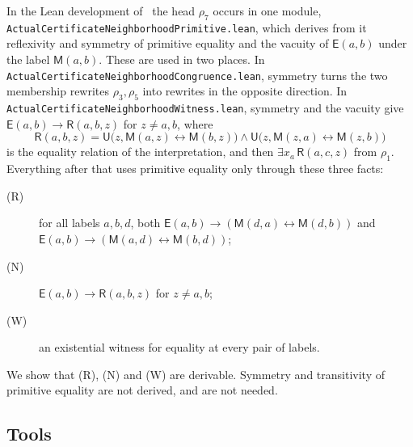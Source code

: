 \documentclass[11pt,letterpaper]{article}
\newcommand{\Mc}{\mathsf{M}}
\newcommand{\Uc}{\mathsf{U}}
\newcommand{\Ec}{\mathsf{E}}
\newcommand{\Rc}{\mathsf{R}}
\newcommand{\file}[1]{\texttt{\nolinkurl{#1}}}
\begin{document}
In the Lean development of~\cite{pa209} the head $\rho_7$ occurs in
one module, \file{ActualCertificateNeighborhoodPrimitive.lean}, which
derives from it reflexivity and symmetry of primitive equality and the
vacuity of $\Ec(a,b)$ under the label $\Mc(a,b)$. These are used in two
places. In \file{ActualCertificateNeighborhoodCongruence.lean},
symmetry turns the two membership rewrites $\rho_3,\rho_5$ into
rewrites in the opposite direction. In
\file{ActualCertificateNeighborhoodWitness.lean}, symmetry and the
vacuity give $\Ec(a,b)\to\Rc(a,b,z)$ for $z\ne a,b$, where
\[
 \Rc(a,b,z)=\Uc\bigl(z,\Mc(a,z)\leftrightarrow\Mc(b,z)\bigr)\wedge
            \Uc\bigl(z,\Mc(z,a)\leftrightarrow\Mc(z,b)\bigr)
\]
is the equality relation of the interpretation, and then
$\exists x_a\,\Rc(a,c,z)$ from $\rho_1$. Everything after that uses
primitive equality only through these three facts:
\begin{description}
\item[(R)] for all labels $a,b,d$, both
  $\Ec(a,b)\to(\Mc(d,a)\leftrightarrow\Mc(d,b))$ and
  $\Ec(a,b)\to(\Mc(a,d)\leftrightarrow\Mc(b,d))$;
\item[(N)] $\Ec(a,b)\to\Rc(a,b,z)$ for $z\ne a,b$;
\item[(W)] an existential witness for equality at every pair of
  labels.
\end{description}
We show that (R), (N) and (W) are derivable. Symmetry and
transitivity of primitive equality are not derived, and are not
needed.

\subsection{Tools}\label{sec:tools}
\end{document}
